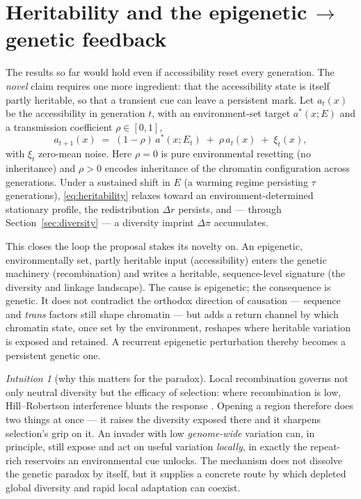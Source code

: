 \documentclass[11pt]{article}
\theoremstyle{remark}
\newtheorem*{remark}{Intuition}
\begin{document}
\section{Heritability and the epigenetic\,$\to$\,genetic feedback}
\label{sec:feedback}

The results so far would hold even if accessibility reset every generation. The
\emph{novel} claim requires one more ingredient: that the accessibility state is
itself partly heritable, so that a transient cue can leave a persistent mark. Let
$a_t(x)$ be the accessibility in generation $t$, with an environment-set target
$a^\ast(x; E)$ and a transmission coefficient $\rho \in [0,1]$,
\begin{equation}
a_{t+1}(x) \;=\; (1-\rho)\,a^\ast(x; E_t) \;+\; \rho\, a_t(x) \;+\; \xi_t(x),
\label{eq:heritability}
\end{equation}
with $\xi_t$ zero-mean noise. Here $\rho=0$ is pure environmental resetting (no
inheritance) and $\rho>0$ encodes inheritance of the chromatin configuration
across generations. Under a sustained shift in $E$ (a warming regime persisting
$\tau$ generations), \eqref{eq:heritability} relaxes toward an
environment-determined stationary profile, the redistribution $\Delta r$
persists, and --- through Section~\ref{sec:diversity} --- a diversity imprint
$\Delta\pi$ accumulates.

This closes the loop the proposal stakes its novelty on. An epigenetic,
environmentally set, partly heritable input (accessibility) enters the genetic
machinery (recombination) and writes a heritable, sequence-level signature (the
diversity and linkage landscape). The cause is epigenetic; the consequence is
genetic. It does not contradict the orthodox direction of causation --- sequence
and \emph{trans} factors still shape chromatin --- but adds a return channel by
which chromatin state, once set by the environment, reshapes where heritable
variation is exposed and retained. A recurrent epigenetic perturbation thereby
becomes a persistent genetic one.

\begin{remark}[why this matters for the paradox]
Local recombination governs not only neutral diversity but the efficacy of
selection: where recombination is low, Hill--Robertson interference blunts the
response \citep{hillrobertson1966}. Opening a region therefore does two things at
once --- it raises the diversity exposed there and it sharpens selection's grip on
it. An invader with low \emph{genome-wide} variation can, in principle, still
expose and act on useful variation \emph{locally}, in exactly the repeat-rich
reservoirs an environmental cue unlocks. The mechanism does not dissolve the
genetic paradox by itself, but it supplies a concrete route by which depleted
global diversity and rapid local adaptation can coexist.
\end{remark}
\end{document}
